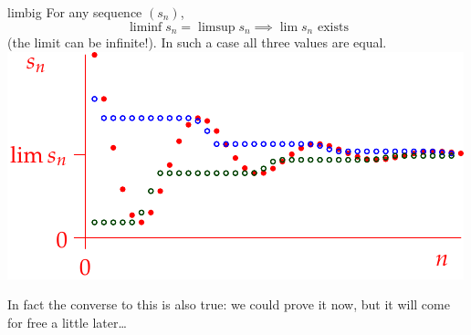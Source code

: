 \begin{lemm}[lower separated=false, sidebyside, sidebyside align=top seam, sidebyside gap=0pt, righthand width=0.48\linewidth]{}{limbig}
	For any sequence $(s_n)$,
	\[\liminf s_n=\limsup s_n \implies\lim s_n\text{ exists}\]
	(the limit can be infinite!).\smallbreak
	In such a case all three values are equal.
	\tcblower
	\hfill\includegraphics[scale=0.8]{limsup1}
\end{lemm}

In fact the converse to this is also true: we could prove it now, but it will come for free a little later\ldots


